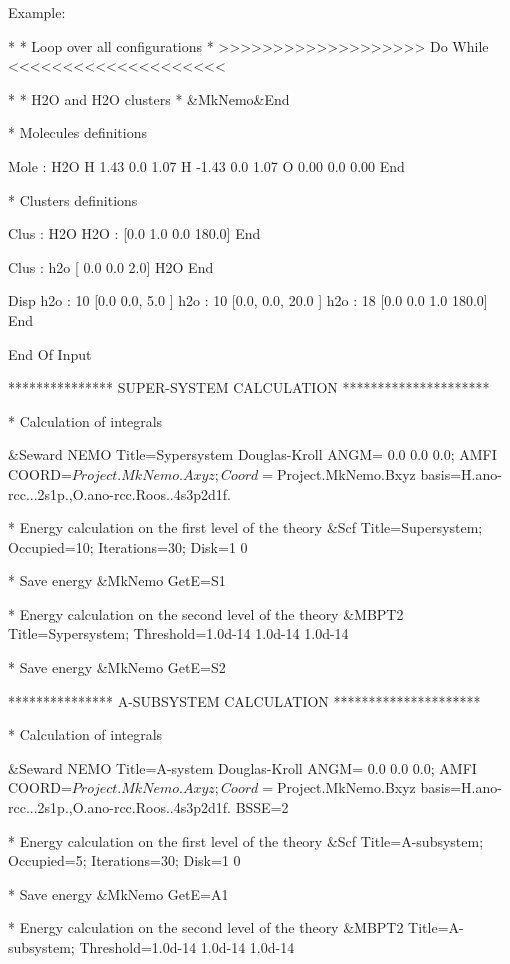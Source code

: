 Example:
\begin{sourcelisting}
*
* Loop over all configurations
*
>>>>>>>>>>>>>>>>>>> Do While <<<<<<<<<<<<<<<<<<<<

  *
  * H2O and H2O clusters
  *
  &MkNemo&End

    * Molecules definitions

    Mole : H2O
     H   1.43  0.0  1.07
     H  -1.43  0.0  1.07
     O   0.00  0.0  0.00
    End

    * Clusters definitions

    Clus : H2O
     H2O : [0.0 1.0 0.0 180.0]
    End

    Clus : h2o [ 0.0 0.0 2.0]
     H2O
    End

    Disp
      h2o : 10 [0.0  0.0, 5.0       ]
      h2o : 10 [0.0, 0.0, 20.0      ]
      h2o : 18 [0.0  0.0  1.0  180.0]
    End


  End Of Input


  *************** SUPER-SYSTEM CALCULATION *********************

  * Calculation of integrals

  &Seward
    NEMO
    Title=Sypersystem
    Douglas-Kroll
    ANGM= 0.0 0.0 0.0; AMFI
    COORD=$Project.MkNemo.Axyz;Coord=$Project.MkNemo.Bxyz
    basis=H.ano-rcc...2s1p.,O.ano-rcc.Roos..4s3p2d1f.


  * Energy calculation on the first level of the theory
  &Scf
    Title=Supersystem; Occupied=10; Iterations=30; Disk=1 0


  * Save energy
  &MkNemo
    GetE=S1

  * Energy calculation on the second level of the theory
  &MBPT2
    Title=Sypersystem; Threshold=1.0d-14 1.0d-14 1.0d-14


  * Save energy
  &MkNemo
    GetE=S2


  *************** A-SUBSYSTEM CALCULATION *********************

  * Calculation of integrals

  &Seward
    NEMO
    Title=A-system
    Douglas-Kroll
    ANGM= 0.0 0.0 0.0; AMFI
    COORD=$Project.MkNemo.Axyz;Coord=$Project.MkNemo.Bxyz
    basis=H.ano-rcc...2s1p.,O.ano-rcc.Roos..4s3p2d1f.
    BSSE=2


  * Energy calculation on the first level of the theory
  &Scf
    Title=A-subsystem; Occupied=5; Iterations=30; Disk=1 0

  * Save energy
  &MkNemo
    GetE=A1

  * Energy calculation on the second level of the theory
  &MBPT2
    Title=A-subsystem; Threshold=1.0d-14 1.0d-14 1.0d-14


\end{sourcelisting}
